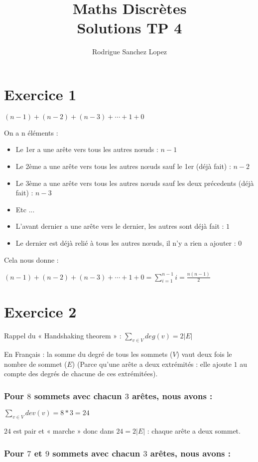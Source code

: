 \documentclass[fontsize=10pt]{article}
\title{\textbf{Maths Discrètes}\\ Solutions TP 4}
\author{Rodrigue Sanchez Lopez}
\date{}
\begin{document}
\maketitle %


\section*{Exercice 1}
$(n-1) + (n-2) + (n-3) + \cdots + 1 + 0$

On a n éléments :
\begin{itemize}
    \itemsep0em
    \item Le 1er a une arête vers tous les autres nœuds : $n-1$
    \item Le 2ème a une arête vers tous les autres nœuds sauf le 1er (déjà fait) : $n-2$
    \item Le 3ème a une arête vers tous les autres nœuds sauf les deux précedents (déjà fait) : $n-3$
    \item Etc ...
    \item L'avant dernier a une arête vers le dernier, les autres sont déjà fait : $1$
    \item Le dernier est déjà relié à tous les autres nœuds, il n'y a rien a ajouter : $0$
\end{itemize}

Cela nous donne :

$(n-1) + (n-2) + (n-3) + \cdots + 1 + 0 = \displaystyle\sum_{i=1}^{n-1} i = \frac{n ( n - 1)}{2}$

\section*{Exercice 2}
Rappel du « Handshaking theorem » :
$ \displaystyle\sum_{v \in V} deg(v) = 2 |E|$

En Français : la somme du degré de tous les sommets ($V$) vaut deux fois le nombre de sommet ($E$) (Parce qu'une arête a deux extrémités : elle ajoute $1$ au compte des degrés de chacune de ces extrémitées).

\subsubsection*{Pour $8$ sommets avec chacun $3$ arêtes, nous avons :}
$\displaystyle\sum_{v \in V} dev(v) = 8 * 3 = 24$

$24$ est pair et « marche » donc dans $24 = 2 |E|$ : chaque arête a deux sommet.

\subsubsection*{Pour $7$ et $9$ sommets avec chacun $3$ arêtes, nous avons :}
\end{document}
